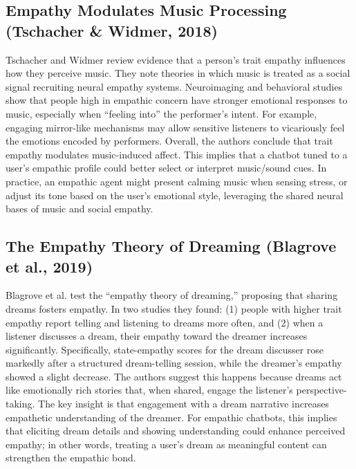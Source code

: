 \documentclass[conference]{IEEEtran}
\begin{document}
    \subsection{Empathy Modulates Music Processing (Tschacher & Widmer, 2018)}
    Tschacher and Widmer review evidence that a person’s trait empathy influences how they perceive music. They note theories in which music is treated as a social signal recruiting neural empathy systems. Neuroimaging and behavioral studies show that people high in empathic concern have stronger emotional responses to music, especially when “feeling into” the performer’s intent. For example, engaging mirror-like mechanisms may allow sensitive listeners to vicariously feel the emotions encoded by performers. Overall, the authors conclude that trait empathy modulates music-induced affect. This implies that a chatbot tuned to a user’s empathic profile could better select or interpret music/sound cues. In practice, an empathic agent might present calming music when sensing stress, or adjust its tone based on the user’s emotional style, leveraging the shared neural bases of music and social empathy.

    \subsection{The Empathy Theory of Dreaming (Blagrove et al., 2019)}
    Blagrove et al. test the “empathy theory of dreaming,” proposing that sharing dreams fosters empathy. In two studies they found: (1) people with higher trait empathy report telling and listening to dreams more often, and (2) when a listener discusses a dream, their empathy toward the dreamer increases significantly. Specifically, state-empathy scores for the dream discusser rose markedly after a structured dream-telling session, while the dreamer’s empathy showed a slight decrease. The authors suggest this happens because dreams act like emotionally rich stories that, when shared, engage the listener’s perspective-taking. The key insight is that engagement with a dream narrative increases empathetic understanding of the dreamer. For empathic chatbots, this implies that eliciting dream details and showing understanding could enhance perceived empathy; in other words, treating a user’s dream as meaningful content can strengthen the empathic bond.
\end{document}
